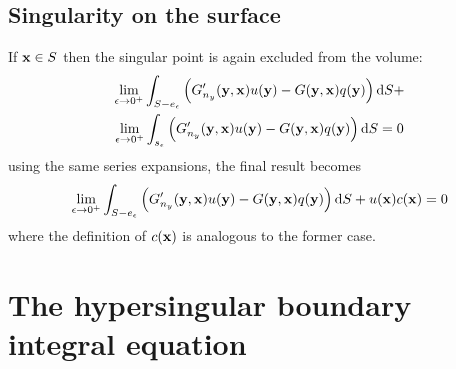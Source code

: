 \documentclass[a4paper,11pt]{article}
\newcommand{\td}{\mathrm{d}}
\begin{document}
\subsection{Singularity on the surface}

If ${\bf x} \in S$ then the singular point is again excluded from the volume:
%
\begin{multline}
\lim_{\epsilon \to 0^+}
\int_{S-e_{\epsilon}}
\left(
G'_{n_y}({\bf y}, {\bf x}) u({\bf y}) - G({\bf y}, {\bf x}) q({\bf y})
\right)
\td S
+
\\
\lim_{\epsilon \to 0^+}
\int_{s_{\epsilon}}
\left(
G'_{n_y}({\bf y}, {\bf x}) u({\bf y}) - G({\bf y}, {\bf x}) q({\bf y})
\right)
\td S = 0
\end{multline}
%
using the same series expansions, the final result becomes
%
\begin{equation}
\lim_{\epsilon \to 0^+}
\int_{S-e_{\epsilon}}
\left(
G'_{n_y}({\bf y}, {\bf x}) u({\bf y}) - G({\bf y}, {\bf x}) q({\bf y})
\right)
\td S
+
u({\bf x})
c({\bf x})
= 0
\end{equation}
%
where the definition of $c({\bf x})$ is analogous to the former case.

\section{The hypersingular boundary integral equation}
\end{document}
